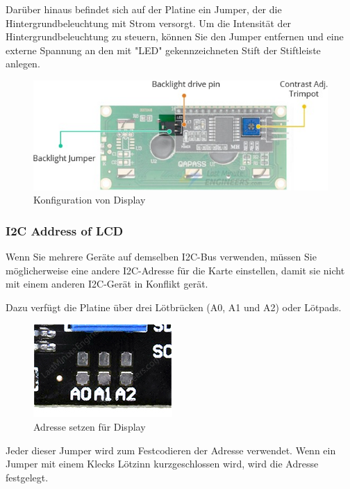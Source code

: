 \documentclass[conference]{IEEEtran}
\begin{document}
Darüber hinaus befindet sich auf der Platine ein Jumper, der die Hintergrundbeleuchtung mit Strom versorgt. Um die Intensität der Hintergrundbeleuchtung zu steuern, können Sie den Jumper entfernen und eine externe Spannung an den mit "LED" gekennzeichneten Stift der Stiftleiste anlegen.


\begin{figure}
	\begin{center}
		\includegraphics[scale=0.35]{dspl2}
	\end{center}
	\caption{Konfiguration von Display}
\end{figure}

\subsubsection{I2C Address of LCD}
Wenn Sie mehrere Geräte auf demselben I2C-Bus verwenden, müssen Sie möglicherweise eine andere I2C-Adresse für die Karte einstellen, damit sie nicht mit einem anderen I2C-Gerät in Konflikt gerät.

Dazu verfügt die Platine über drei Lötbrücken (A0, A1 und A2) oder Lötpads.

\begin{figure}
	\begin{center}
		\includegraphics[scale=0.45]{dspl3}
	\end{center}
	\caption{Adresse setzen für Display}
\end{figure}

Jeder dieser Jumper wird zum Festcodieren der Adresse verwendet. Wenn ein Jumper mit einem Klecks Lötzinn kurzgeschlossen wird, wird die Adresse festgelegt.
\end{document}
